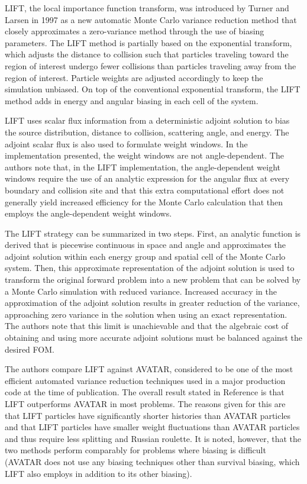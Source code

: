 LIFT, the local importance function transform, was introduced by Turner and Larsen in
1997 \cite{lift1, lift2} as a new automatic Monte Carlo variance reduction method that
closely approximates a zero-variance method through the use of biasing parameters. The
LIFT method is partially based on the exponential transform, which adjusts the 
distance to collision such that particles traveling toward the region of interest 
undergo fewer collisions than particles traveling away from the region of interest.
Particle weights are adjusted accordingly to keep the simulation unbiased. On top of
the conventional exponential transform, the LIFT method adds in energy and angular
biasing in each cell of the system.

LIFT uses scalar flux information from a deterministic adjoint solution to bias the
source distribution, distance to collision, scattering angle, and energy. The adjoint 
scalar flux is also used to formulate weight windows. In the implementation 
presented, the weight windows are not angle-dependent. The authors note that, in the 
LIFT implementation, the angle-dependent weight windows require the use of an 
analytic expression for the angular flux at every boundary and collision site and 
that this extra computational effort does not generally yield increased efficiency 
for the Monte Carlo calculation that then employs the angle-dependent weight windows.

The LIFT strategy can be summarized in two steps. First, an analytic function is
derived that is piecewise continuous in space and angle and approximates the adjoint
solution within each energy group and spatial cell of the Monte Carlo system. Then,
this approximate representation of the adjoint solution is used to transform the
original forward problem into a new problem that can be solved by a Monte Carlo 
simulation with reduced variance. Increased accuracy in the approximation of the
adjoint solution results in greater reduction of the variance, approaching zero
variance in the solution when using an exact representation. The authors note that 
this limit is unachievable and that the algebraic cost of obtaining and using more
accurate adjoint solutions must be balanced against the desired FOM. 

The authors compare LIFT against AVATAR, considered to be one of the most efficient
automated variance reduction techniques used in a major production code at the time of
publication. The overall result stated in Reference \cite{lift1} is that LIFT 
outperforms 
AVATAR in most problems. The reasons given for this are that LIFT particles have 
significantly shorter histories than AVATAR particles and that LIFT particles have
smaller weight fluctuations than AVATAR particles and thus require less splitting and 
Russian roulette. It is noted, however, that the two methods perform comparably for
problems where biasing is difficult (AVATAR does not use any biasing techniques other
than survival biasing, which LIFT also employs in addition to its other biasing).

